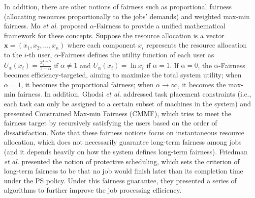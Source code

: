 In addition, there are other notions of fairness such as proportional fairness (allocating resources proportionally to the jobs' demands) and weighted max-min fairness. Mo \textit{et al.} \cite{mo2000fair} proposed $\alpha$-Fairness to provide a unified mathematical framework for these concepts. Suppose the resource allocation is a vector $\mathbf{x} = (x_1, x_2, \dots, x_n)$ where each component $x_i$ represents the resource allocation to the $i$-th user, $\alpha$-Fairness defines the utility function of each user as $U_\alpha (x_i) = \frac{x_i^{1-\alpha}}{1-\alpha}$ if $\alpha \ne 1$ and $U_\alpha (x_i) = \ln x_i$ if $\alpha = 1$. If $\alpha=0$, the $\alpha$-Fairness becomes efficiency-targeted, aiming to maximize the total system utility; when $\alpha=1$, it becomes the proportional fairness; when $\alpha \rightarrow \infty$, it becomes the max-min fairness. In addition, Ghodsi \textit{et al.} \cite{choosy} addressed task placement constraints (i.e., each task can only be assigned to a certain subset of machines in the system) and presented Constrained Max-min Fairness (CMMF), which tries to meet the fairness target by recursively satisfying the users based on the order of dissatisfaction. Note that these fairness notions focus on instantaneous resource allocation, which does not necessarily guarantee long-term fairness among jobs (and it depends heavily on how the system defines long-term fairness). Friedman \textit{et al.} \cite{friedman2003fairness, friedman2003protective} presented the notion of protective scheduling, which sets the criterion of long-term fairness to be that no job would finish later than its completion time under the PS policy. Under this fairness guarantee, they presented a series of algorithms to further improve the job processing efficiency. %

